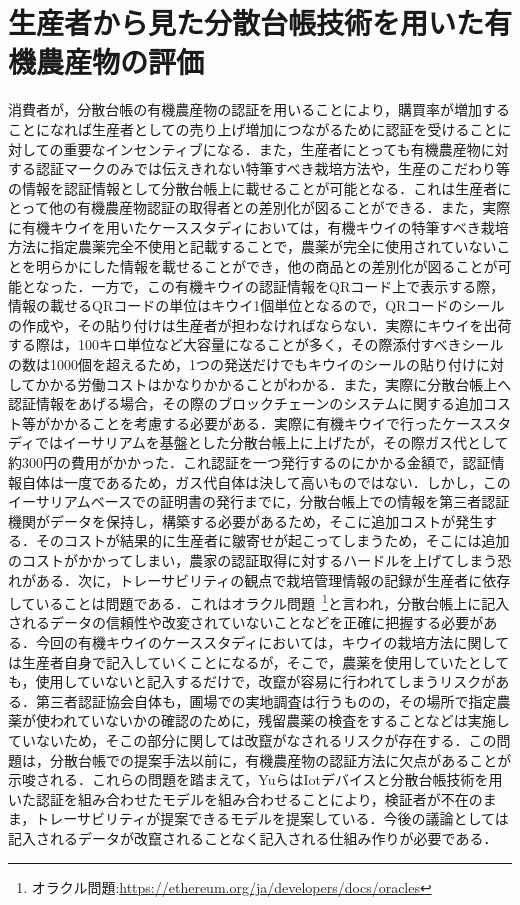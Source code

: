\documentclass[11pt,dvipdfmx]{jreport}
\begin{document}
\section{生産者から見た分散台帳技術を用いた有機農産物の評価}
消費者が，分散台帳の有機農産物の認証を用いることにより，購買率が増加することになれば生産者としての売り上げ増加につながるために認証を受けることに対しての重要なインセンティブになる．また，生産者にとっても有機農産物に対する認証マークのみでは伝えきれない特筆すべき栽培方法や，生産のこだわり等の情報を認証情報として分散台帳上に載せることが可能となる．これは生産者にとって他の有機農産物認証の取得者との差別化が図ることができる．また，実際に有機キウイを用いたケーススタディにおいては，有機キウイの特筆すべき栽培方法に指定農薬完全不使用と記載することで，農薬が完全に使用されていないことを明らかにした情報を載せることができ，他の商品との差別化が図ることが可能となった．一方で，この有機キウイの認証情報をQRコード上で表示する際，情報の載せるQRコードの単位はキウイ1個単位となるので，QRコードのシールの作成や，その貼り付けは生産者が担わなければならない．実際にキウイを出荷する際は，100キロ単位など大容量になることが多く，その際添付すべきシールの数は1000個を超えるため，1つの発送だけでもキウイのシールの貼り付けに対してかかる労働コストはかなりかかることがわかる．また，実際に分散台帳上へ認証情報をあげる場合，その際のブロックチェーンのシステムに関する追加コスト等がかかることを考慮する必要がある．実際に有機キウイで行ったケーススタディではイーサリアムを基盤とした分散台帳上に上げたが，その際ガス代として約300円の費用がかかった．これ認証を一つ発行するのにかかる金額で，認証情報自体は一度であるため，ガス代自体は決して高いものではない．しかし，このイーサリアムベースでの証明書の発行までに，分散台帳上での情報を第三者認証機関がデータを保持し，構築する必要があるため，そこに追加コストが発生する．そのコストが結果的に生産者に皺寄せが起こってしまうため，そこには追加のコストがかかってしまい，農家の認証取得に対するハードルを上げてしまう恐れがある．次に，トレーサビリティの観点で栽培管理情報の記録が生産者に依存していることは問題である．これはオラクル問題~\footnote[6]{オラクル問題:\url{https://ethereum.org/ja/developers/docs/oracles}}と言われ，分散台帳上に記入されるデータの信頼性や改変されていないことなどを正確に把握する必要がある．今回の有機キウイのケーススタディにおいては，キウイの栽培方法に関しては生産者自身で記入していくことになるが，そこで，農薬を使用していたとしても，使用していないと記入するだけで，改竄が容易に行われてしまうリスクがある．第三者認証協会自体も，圃場での実地調査は行うものの，その場所で指定農薬が使われていないかの確認のために，残留農薬の検査をすることなどは実施していないため，そこの部分に関しては改竄がなされるリスクが存在する．この問題は，分散台帳での提案手法以前に，有機農産物の認証方法に欠点があることが示唆される．これらの問題を踏まえて，YuらはIotデバイスと分散台帳技術を用いた認証を組み合わせたモデルを組み合わせることにより，検証者が不在のまま，トレーサビリティが提案できるモデルを提案している\cite{zyusu}．今後の議論としては記入されるデータが改竄されることなく記入される仕組み作りが必要である．
\end{document}
